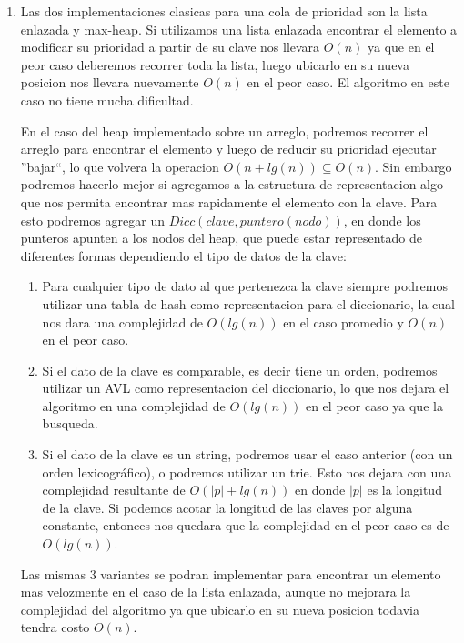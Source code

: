 \documentclass[10pt, a4paper]{report}
\begin{document}
\begin{enumerate}
 \item  Las dos implementaciones clasicas para una cola de prioridad son la lista enlazada y max-heap. Si utilizamos una lista enlazada encontrar el elemento a modificar su prioridad a partir de su clave nos llevara $O(n)$ ya que en el peor caso deberemos recorrer toda la lista, luego ubicarlo en su nueva posicion nos llevara nuevamente $O(n)$ en el peor caso. El algoritmo en este caso no tiene mucha dificultad.
 
 En el caso del heap implementado sobre un arreglo, podremos recorrer el arreglo para encontrar el elemento y luego de reducir su prioridad ejecutar ''bajar``, lo que volvera la operacion $O(n+lg(n))\subseteq O(n)$. Sin embargo podremos hacerlo mejor si agregamos a la estructura de representacion algo que nos permita encontrar mas rapidamente el elemento con la clave. Para esto podremos agregar un $Dicc(clave, puntero(nodo))$, en donde los punteros apunten a los nodos del heap, que puede estar representado de diferentes formas dependiendo el tipo de datos de la clave:
 
 \begin{enumerate}
  \item Para cualquier tipo de dato al que pertenezca la clave siempre podremos utilizar una tabla de hash como representacion para el diccionario, la cual nos dara una complejidad de $O(lg(n))$ en el caso promedio y $O(n)$ en el peor caso.
  \item Si el dato de la clave es comparable, es decir tiene un orden, podremos utilizar un AVL como representacion del diccionario, lo que nos dejara el algoritmo en una complejidad de $O(lg(n))$ en el peor caso ya que la busqueda.
  \item Si el dato de la clave es un string, podremos usar el caso anterior (con un orden lexicogr\'afico), o podremos utilizar un trie. Esto nos dejara con una complejidad resultante de $O(|p|+lg(n))$ en donde $|p|$ es la longitud de la clave. Si podemos acotar la longitud de las claves por alguna constante, entonces nos quedara que la complejidad en el peor caso es de $O(lg(n))$.
 \end{enumerate}
 
 Las mismas 3 variantes se podran implementar para encontrar un elemento mas velozmente en el caso de la lista enlazada, aunque no mejorara la complejidad del algoritmo ya que ubicarlo en su nueva posicion todavia tendra costo $O(n)$.


\end{enumerate}
\end{document}
